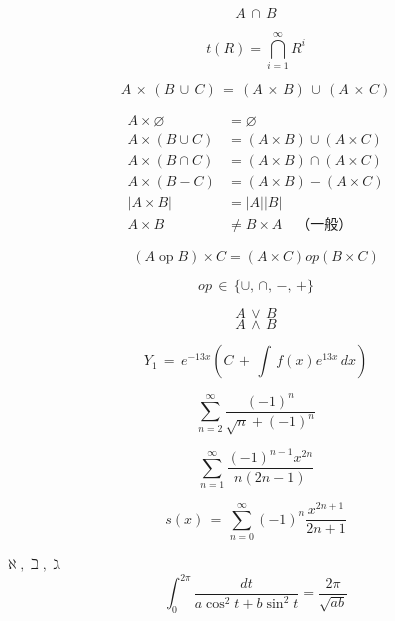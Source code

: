 \documentclass{ctexart}
\begin{document}
\[
A\,\cap\,B
\]

\[
t(R)=\bigcap_{i=1}^{\infty}R^i
\]

\[
A\,\times\,(B\,\cup\,C)\,=\,(A\,\times\,B)\,\cup\,(A\,\times\,C)
\]


$$ \boxed{ \begin{aligned} A\times\varnothing&=\varnothing\\
    A\times(B\cup C)&=(A\times B)\cup(A\times C)\\ 
    A\times(B\cap C)&=(A\times B)\cap(A\times C)\\ 
    A\times(B-C)&=(A\times B)-(A\times C)\\ 
    |A\times B|&=|A||B|\\ 
    A\times B&\neq B\times A\quad\text{（一般）} 
\end{aligned}} $$



\[
    (A\operatorname{op}B)\times C 
    =(A \times C) op (B\times C) 
\]

\[
    op\,\in\,\{\cup,\,\cap,\,−,\,+\}
\]

\[
A\,\lor\,B
\]
\[
A\,\wedge\,B
\]


\[
Y_1\,=\,e^{-13x}(C\,+\,\int\,f(x)e^{13x}\,dx)
\]

\[
\sum_{n=2}^{\infty} \frac{(-1)^n}{\sqrt{n}+(-1)^n}
\]

\[
\sum_{n=1}^{\infty}\frac{(-1)^{n-1}x^{2n}}{n(2n-1)}
\]

\[
s(x)\,=\,\sum_{n=0}^{\infty}(-1)^n\frac{x^{2n+1}}{2n+1}
\] 

$\aleph, \beth, \gimel$
\[
\int_0^{2\pi}\frac{dt}{a\cos^2t+b\sin^2t}=\frac{2\pi}{\sqrt{ab}}
\]
\end{document}
